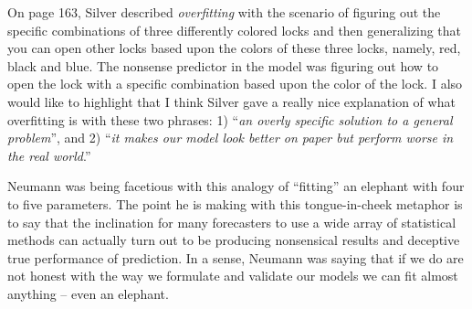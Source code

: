 \documentclass[12pt]{article}
\begin{document}
\begin{enumerate}

\begin{tcolorbox}[colback = white, sharp corners]
On page 163, Silver described \emph{overfitting} with the scenario of figuring out the specific combinations of three differently colored locks and then generalizing that you can open other locks based upon the colors of these three locks, namely, red, black and blue. The nonsense predictor in the model was figuring out how to open the lock with a specific combination based upon the color of the lock.
I also would like to highlight that I think Silver gave a really nice explanation of what overfitting is with these two phrases: 1) ``\emph{an overly specific solution to a general problem}'', and 2) ``\emph{it makes our model look better on paper but perform worse in the real world}.'' 

\end{tcolorbox}


\begin{tcolorbox}[colback = white, sharp corners]
Neumann was being facetious with this analogy of ``fitting'' an elephant with four to five parameters. The point he is making with this tongue-in-cheek metaphor is to say that the inclination for many forecasters to use a wide array of statistical methods can actually turn out to be producing nonsensical results and deceptive true performance of prediction. In a sense, Neumann was saying that if we do are not honest with the way we formulate and validate our models we can fit almost anything -- even an elephant. 
\end{tcolorbox}

\newpage


\end{enumerate}
\end{document}
